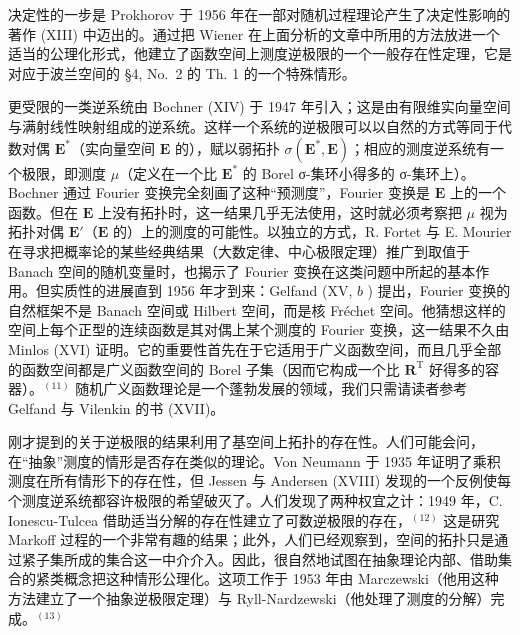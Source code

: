 决定性的一步是 Prokhorov 于 1956 年在一部对随机过程理论产生了决定性影响的著作 (XIII) 中迈出的。通过把 Wiener 在上面分析的文章中所用的方法放进一个适当的公理化形式，他建立了函数空间上测度逆极限的一个一般存在性定理，它是对应于波兰空间的 §4, No.~2 的 Th. 1 的一个特殊情形。

更受限的一类逆系统由 Bochner (XIV) 于 1947 年引入；这是由有限维实向量空间与满射线性映射组成的逆系统。这样一个系统的逆极限可以以自然的方式等同于代数对偶 \(\mathbf{E}^*\)（实向量空间 \(\mathbf{E}\) 的），赋以弱拓扑 \(\sigma (\mathbf{E}^{*},\mathbf{E})\)；相应的测度逆系统有一个极限，即测度 \(\mu\)（定义在一个比 \(\mathbf{E}^*\) 的 Borel σ-集环小得多的 σ-集环上）。Bochner 通过 Fourier 变换完全刻画了这种“预测度”，Fourier 变换是 \(\mathbf{E}\) 上的一个函数。但在 \(\mathbf{E}\) 上没有拓扑时，这一结果几乎无法使用，这时就必须考察把 \(\mu\) 视为拓扑对偶 \(\mathbf{E}'\)（\(\mathbf{E}\) 的）上的测度的可能性。以独立的方式，R. Fortet 与 E. Mourier 在寻求把概率论的某些经典结果（大数定律、中心极限定理）推广到取值于 Banach 空间的随机变量时，也揭示了 Fourier 变换在这类问题中所起的基本作用。但实质性的进展直到 1956 年才到来：Gelfand (XV, \(b\) ) 提出，Fourier 变换的自然框架不是 Banach 空间或 Hilbert 空间，而是核 Fréchet 空间。他猜想这样的空间上每个正型的连续函数是其对偶上某个测度的 Fourier 变换，这一结果不久由 Minlos (XVI) 证明。它的重要性首先在于它适用于广义函数空间，而且几乎全部的函数空间都是广义函数空间的 Borel 子集（因而它构成一个比 \(\mathbf{R}^{\mathrm{T}}\) 好得多的容器）。\(^{(11)}\) 随机广义函数理论是一个蓬勃发展的领域，我们只需请读者参考 Gelfand 与 Vilenkin 的书 (XVII)。

刚才提到的关于逆极限的结果利用了基空间上拓扑的存在性。人们可能会问，在“抽象”测度的情形是否存在类似的理论。Von Neumann 于 1935 年证明了乘积测度在所有情形下的存在性，但 Jessen 与 Andersen (XVIII) 发现的一个反例使每个测度逆系统都容许极限的希望破灭了。人们发现了两种权宜之计：1949 年，C. Ionescu-Tulcea 借助适当分解的存在性建立了可数逆极限的存在，\(^{(12)}\) 这是研究 Markoff 过程的一个非常有趣的结果；此外，人们已经观察到，空间的拓扑只是通过紧子集所成的集合这一中介介入。因此，很自然地试图在抽象理论内部、借助集合的紧类概念把这种情形公理化。这项工作于 1953 年由 Marczewski（他用这种方法建立了一个抽象逆极限定理）与 Ryll-Nardzewski（他处理了测度的分解）完成。\(^{(13)}\)

